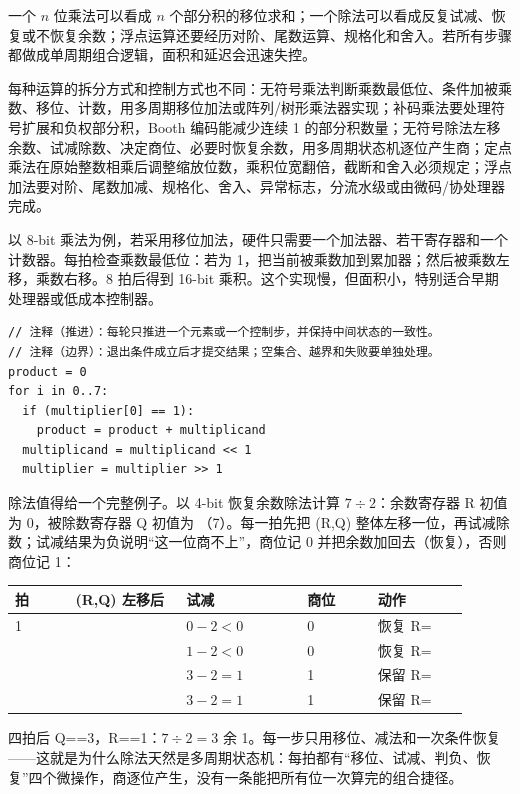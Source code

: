 一个 \(n\) 位乘法可以看成 \(n\) 个部分积的移位求和；一个除法可以看成反复试减、恢复或不恢复余数；浮点运算还要经历对阶、尾数运算、规格化和舍入。若所有步骤都做成单周期组合逻辑，面积和延迟会迅速失控。

每种运算的拆分方式和控制方式也不同：无符号乘法判断乘数最低位、条件加被乘数、移位、计数，用多周期移位加法或阵列/树形乘法器实现；补码乘法要处理符号扩展和负权部分积，Booth 编码能减少连续 1 的部分积数量；无符号除法左移余数、试减除数、决定商位、必要时恢复余数，用多周期状态机逐位产生商；定点乘法在原始整数相乘后调整缩放位数，乘积位宽翻倍，截断和舍入必须规定；浮点加法要对阶、尾数加减、规格化、舍入、异常标志，分流水级或由微码/协处理器完成。

以 8-bit 乘法为例，若采用移位加法，硬件只需要一个加法器、若干寄存器和一个计数器。每拍检查乘数最低位：若为 1，把当前被乘数加到累加器；然后被乘数左移，乘数右移。8 拍后得到 16-bit 乘积。这个实现慢，但面积小，特别适合早期处理器或低成本控制器。

\begin{lstlisting}
// 注释（推进）：每轮只推进一个元素或一个控制步，并保持中间状态的一致性。
// 注释（边界）：退出条件成立后才提交结果；空集合、越界和失败要单独处理。
product = 0
for i in 0..7:
  if (multiplier[0] == 1):
    product = product + multiplicand
  multiplicand = multiplicand << 1
  multiplier = multiplier >> 1
\end{lstlisting}

除法值得给一个完整例子。以 4-bit 恢复余数除法计算 $7 \div 2$：余数寄存器 R 初值为 0，被除数寄存器 Q 初值为 （7）。每一拍先把 (R,Q) 整体左移一位，再试减除数；试减结果为负说明“这一位商不上”，商位记 0 并把余数加回去（恢复），否则商位记 1：

\begin{longtable}{L{0.12\linewidth}L{0.22\linewidth}L{0.24\linewidth}L{0.14\linewidth}L{0.18\linewidth}}
\toprule
拍 & (R,Q) 左移后 & 试减  & 商位 & 动作 \\
 &  & $0-2<0$ & 0 & 恢复 R= \\ &  & $1-2<0$ & 0 & 恢复 R= \\ &  & $3-2=1$ & 1 & 保留 R= \\ &  & $3-2=1$ & 1 & 保留 R= \\
\bottomrule
\end{longtable}

四拍后 Q==3，R==1：$7 \div 2 = 3$ 余 1。每一步只用移位、减法和一次条件恢复——这就是为什么除法天然是多周期状态机：每拍都有“移位、试减、判负、恢复”四个微操作，商逐位产生，没有一条能把所有位一次算完的组合捷径。

